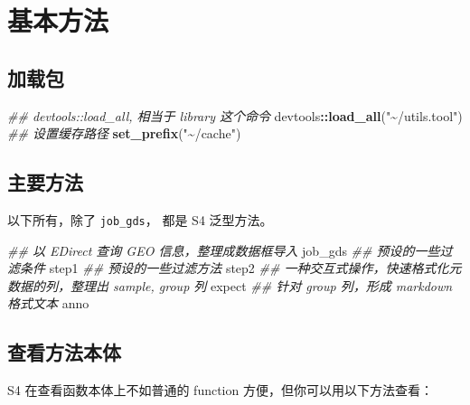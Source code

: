 \documentclass[
]{article}
\newenvironment{Shaded}{\begin{snugshade}}{\end{snugshade}}
\newcommand{\CommentTok}[1]{\textcolor[rgb]{0.56,0.35,0.01}{\textit{#1}}}
\newcommand{\KeywordTok}[1]{\textcolor[rgb]{0.13,0.29,0.53}{\textbf{#1}}}
\newcommand{\NormalTok}[1]{#1}
\newcommand{\OperatorTok}[1]{\textcolor[rgb]{0.81,0.36,0.00}{\textbf{#1}}}
\newcommand{\StringTok}[1]{\textcolor[rgb]{0.31,0.60,0.02}{#1}}
\begin{document}
\hypertarget{ux57faux672cux65b9ux6cd5}{%
\section{基本方法}\label{ux57faux672cux65b9ux6cd5}}

\hypertarget{ux52a0ux8f7dux5305}{%
\subsection{加载包}\label{ux52a0ux8f7dux5305}}

\begin{Shaded}
\begin{Highlighting}[]
\CommentTok{\#\# devtools::load\_all, 相当于 \textasciigrave{}library\textasciigrave{} 这个命令}
\NormalTok{devtools}\OperatorTok{::}\KeywordTok{load\_all}\NormalTok{(}\StringTok{"\textasciitilde{}/utils.tool"}\NormalTok{)}
\CommentTok{\#\# 设置缓存路径}
\KeywordTok{set\_prefix}\NormalTok{(}\StringTok{"\textasciitilde{}/cache"}\NormalTok{)}
\end{Highlighting}
\end{Shaded}

\hypertarget{ux4e3bux8981ux65b9ux6cd5}{%
\subsection{主要方法}\label{ux4e3bux8981ux65b9ux6cd5}}

以下所有，除了 \texttt{job\_gds}， 都是 S4 泛型方法。

\begin{Shaded}
\begin{Highlighting}[]
\CommentTok{\#\# 以 EDirect 查询 GEO 信息，整理成数据框导入}
\NormalTok{job\_gds}
\CommentTok{\#\# 预设的一些过滤条件}
\NormalTok{step1}
\CommentTok{\#\# 预设的一些过滤方法}
\NormalTok{step2}
\CommentTok{\#\# 一种交互式操作，快速格式化元数据的列，整理出 sample, group 列}
\NormalTok{expect}
\CommentTok{\#\# 针对 group 列，形成 markdown 格式文本}
\NormalTok{anno}
\end{Highlighting}
\end{Shaded}

\hypertarget{ux67e5ux770bux65b9ux6cd5ux672cux4f53}{%
\subsection{查看方法本体}\label{ux67e5ux770bux65b9ux6cd5ux672cux4f53}}

S4 在查看函数本体上不如普通的 function 方便，但你可以用以下方法查看：
\end{document}
